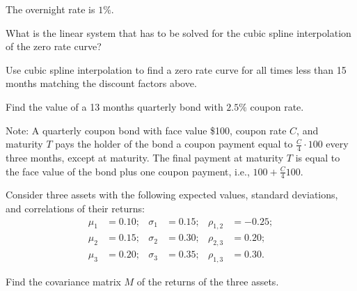 \begin{exercises}
The overnight rate is $1\%$.

\begin{subparts}
\item What is the linear system that has to be solved for the cubic spline
interpolation of the zero rate curve?
\item Use cubic spline interpolation to find a zero rate curve for all times less
than 15 months matching the discount factors above.
\item Find the value of a 13 months quarterly bond with $2.5\%$ coupon rate.
\end{subparts}
\noindent Note: A quarterly coupon bond with face value \$100, coupon rate $C$, and
maturity $T$ pays the holder of the bond a coupon payment equal to
$\frac{C}{4}\cdot 100$ every three months, except at maturity. The final payment at
maturity $T$ is equal to the face value of the bond plus one coupon payment, i.e.,
$100 + \frac{C}{4}100$.

\item Consider three assets with the following expected values, standard
deviations, and correlations of their returns:
\begin{align*}
\mu_1 &= 0.10; & \sigma_1 &= 0.15; & \rho_{1,2} &= -0.25; \\
\mu_2 &= 0.15; & \sigma_2 &= 0.30; & \rho_{2,3} &= 0.20; \\
\mu_3 &= 0.20; & \sigma_3 &= 0.35; & \rho_{1,3} &= 0.30.
\end{align*}
\begin{subparts}
\item Find the covariance matrix $M$ of the returns of the three assets.


\end{subparts}
\end{exercises}
